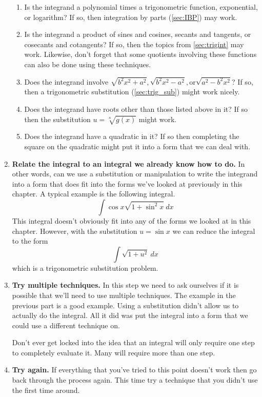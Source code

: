 \begin{enumerate}
\begin{enumerate}
\item Is the integrand a polynomial times a trigonometric function, exponential, or logarithm? If so, then integration by parts (\autoref{sec:IBP}) may work.

\item Is the integrand a product of sines and cosines, secants and tangents, or cosecants and cotangents? If so, then the topics from \autoref{sec:trigint} may work. Likewise, don't forget that some quotients involving these functions can also be done using these techniques.

\item Does the integrand involve $\sqrt {b^2x^2 + a^2}, \sqrt {b^2x^2 - a^2}, \text{or} \sqrt { a^2-b^2x^2}$? If so, then a trigonometric substitution (\autoref{sec:trig_sub}) might work nicely.

\item Does the integrand have roots other than those listed above in it? If so then the substitution $u=\sqrt[n]{g(x)}$ might work.

\item Does the integrand have a quadratic in it? If so then completing the square on the quadratic might put it into a form that we can deal with. 
\end{enumerate}

\item \textbf{Relate the integral to an integral we already know how to do.} In other words, can we use a substitution or manipulation to write the integrand into a  form that does fit into the forms we've looked at previously in this chapter. A typical example is the following integral.
\[\int \cos x\sqrt{1 + \sin^2 x}\ dx\]
This integral doesn't obviously fit into any of the forms we looked at in this chapter. However, with the substitution $u = \sin x$ we can reduce the integral to the form
\[\int \sqrt{1+u^2}\ dx\]
which is a trigonometric substitution problem.

\item \textbf{Try multiple techniques.} In this step we need to ask ourselves if it is possible that we'll need to use multiple techniques. The example in the previous part is a good example. Using a substitution didn't allow us to actually do the integral. All it did was put the integral into a form that we could use a different technique on.

Don't ever get locked into the idea that an integral will only require one step to completely evaluate it. Many will require more than one step.

\item \textbf{Try again.} If everything that you've tried to this point doesn't work then go back through the process again. This time try a technique that you didn't use the first time around.
\end{enumerate}

